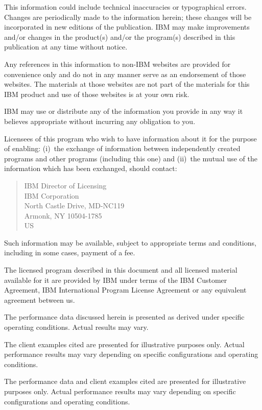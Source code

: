 This information could include technical inaccuracies or typographical
errors.  Changes are periodically made to the information herein; these
changes will be incorporated in new editions of the publication.  IBM may
make improvements and/or changes in the product(s) and/or the program(s)
described in this publication at any time without notice.

Any references in this information to non-IBM websites are provided for
convenience only and do not in any manner serve as an endorsement of those
websites.  The materials at those websites are not part of the materials
for this IBM product and use of those websites is at your own risk.

IBM may use or distribute any of the information you provide in any way it
believes appropriate without incurring any obligation to you.

Licensees of this program who wish to have information about it for the
purpose of enabling: (i)~the exchange of information between independently
created programs and other programs (including this one) and (ii)~the
mutual use of the information which has been exchanged, should contact:
\begin{quote}
  IBM Director of Licensing\\
  IBM Corporation\\
  North Castle Drive, MD-NC119\\
  Armonk, NY 10504-1785\\
  US
\end{quote}

Such information may be available, subject to appropriate terms and
conditions, including in some cases, payment of a fee.

The licensed program described in this document and all licensed material
available for it are provided by IBM under terms of the IBM Customer
Agreement, IBM International Program License Agreement or any equivalent
agreement between us.

The performance data discussed herein is presented as derived under
specific operating conditions.  Actual results may vary.

The client examples cited are presented for illustrative purposes only.
Actual performance results may vary depending on specific configurations
and operating conditions.

The performance data and client examples cited are presented for
illustrative purposes only.  Actual performance results may vary depending
on specific configurations and operating conditions.

